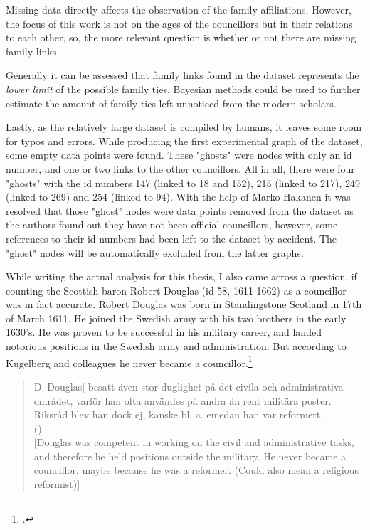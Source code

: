 Missing data directly affects the observation of the family affiliations. However, the focus of this work is not on the ages of the councillors but in their relations to each other, so, the more relevant question is whether or not there are missing family links. 

Generally it can be assessed that family links found in the dataset represents the \textit{lower limit} of the possible family ties. Bayesian methods could be used to further estimate the amount of family ties left unnoticed from the modern scholars.

Lastly, as the relatively large dataset is compiled by humans, it leaves some room for typos and errors. While producing the first experimental graph of the dataset, some empty data points were found. These "ghosts" were nodes with only an id number, and one or two links to the other councillors. All in all, there were four "ghosts" with the id numbers 147 (linked to 18 and 152), 215 (linked to 217), 249 (linked to 269) and 254 (linked to 94). With the help of Marko Hakanen it was resolved that those "ghost" nodes were data points removed from the dataset as the authors found out they have not been official councillors, however, some references to their id numbers had been left to the dataset by accident. The "ghost" nodes will be automatically excluded from the latter graphs.

While writing the actual analysis for this thesis, I also came across a question, if counting the Scottish baron Robert Douglas (id 58, 1611-1662) as a councillor was in fact accurate. Robert Douglas was born in Standingstone Scotland in 17th of March 1611. He joined the Swedish army with his two brothers in the early 1630's. He was proven to be successful in his military career, and landed notorious positions in the Swedish army and administration. But according to Kugelberg and colleagues he never became a councillor.\footcite{sbl_robert_douglas}

\begin{quote}
	D.[Douglas] besatt även stor duglighet på det civila och administrativa området, varför han ofta användes på andra än rent militära poster. Riksråd blev han dock ej, kanske bl. a. emedan han var reformert.\\
	(\cite{sbl_robert_douglas})\\
	
	[Douglas was competent in working on the civil and administrative tasks, and therefore he held positions outside the military. He never became a councillor, maybe because he was a reformer. (Could also mean a religious reformist)]
\end{quote}

